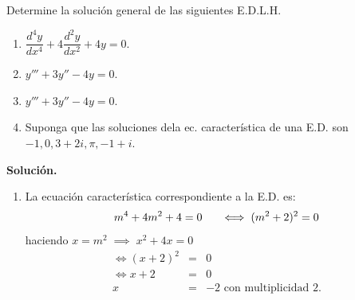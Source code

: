 \documentclass{beamer}
\begin{document}
\begin{frame}[t]
	\vspace{-3mm}
	\begin{example}
		Determine la solución general de las siguientes E.D.L.H.
		\begin{enumerate}
			\item \(\dfrac{d^4y}{dx^4} +4 \dfrac{d^2y}{dx^2} +4y=0\).
			\item \(y''' + 3y'' -4y=0\).
			\item \(y''' +3y'' -4y=0\).
			\item Suponga que las soluciones dela ec. característica de una E.D. son \(-1,0,3+2i, \pi , -1 +i\).
		\end{enumerate}
		\textbf{Solución.} 
		\begin{enumerate}
			\item La ecuación característica correspondiente a la E.D. es: \vspace{-3mm}
		\[
			m^4+4m^2+4 =0 \hspace{5mm} \iff (m^2+2) ^2 =0 \vspace{-3mm}
		\]
		haciendo \(x=m^2 \;\implies\;  x^2+4x=0\)
		\[
			\begin{array}{rcl}
				\iff (x+2) ^2 & = & 0 \\
				\iff x+2 & = & 0\\
				x & = & -2 \mbox{ con multiplicidad } 2.
			\end{array}
		\]
		\end{enumerate}
	\end{example}
\end{frame}
\end{document}
